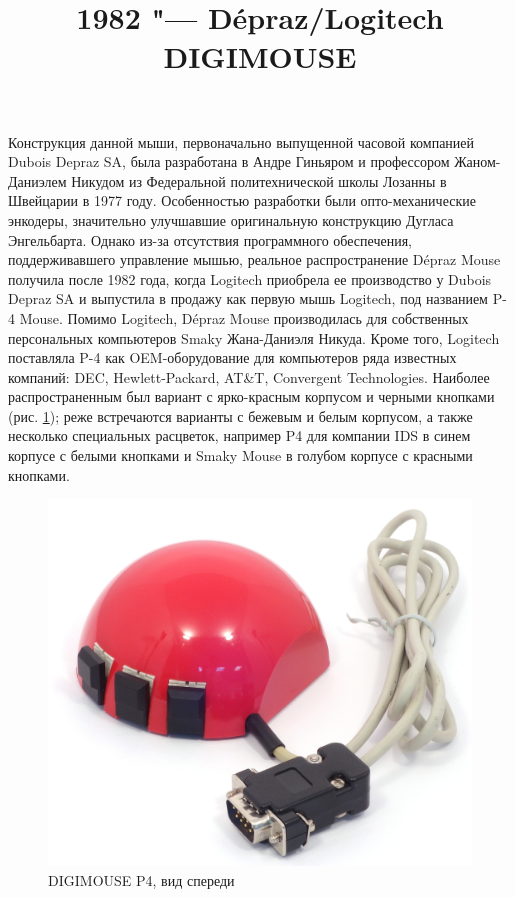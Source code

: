 \documentclass[11pt, a4paper]{article}
\begin{document}
\title{1982 "--- Dépraz/Logitech DIGIMOUSE}
\date{}
\maketitle

Конструкция данной мыши, первоначально выпущенной часовой компанией Dubois Depraz SA, была разработана в Андре Гиньяром и профессором Жаном-Даниэлем Никудом из Федеральной политехнической школы Лозанны в Швейцарии в 1977 году. Особенностью разработки были опто-механические энкодеры, значительно улучшавшие оригинальную конструкцию Дугласа Энгельбарта. Однако из-за отсутствия программного обеспечения, поддерживавшего управление мышью, реальное распространение Dépraz Mouse получила после 1982 года, когда Logitech приобрела ее производство у Dubois Depraz SA и выпустила в продажу как первую мышь Logitech, под названием P-4 Mouse.
Помимо Logitech, Dépraz Mouse производилась для собственных персональных компьютеров Smaky Жана-Даниэля Никуда. Кроме того, Logitech поставляла P-4 как OEM-оборудование для компьютеров ряда известных компаний: DEC, Hewlett-Packard, AT\&T, Convergent Technologies. Наиболее распространенным был вариант с ярко-красным корпусом и черными кнопками (рис. \ref{fig:DIGIMOUSEP4Pic}); реже встречаются варианты с бежевым и белым корпусом, а также несколько специальных расцветок, например P4 для компании IDS в синем корпусе с белыми кнопками и Smaky Mouse в голубом корпусе с красными кнопками. 

\begin{figure}[h]
   \centering
    \includegraphics[scale=0.5]{1982_depraz_digimouse/pic_60.jpg}
    \caption{DIGIMOUSE P4, вид спереди}
    \label{fig:DIGIMOUSEP4Pic}
\end{figure}
\end{document}
